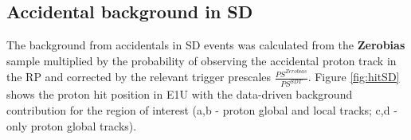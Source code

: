 \subsection{Accidental background in SD}
The background from accidentals in SD events was calculated from the \textbf{Zerobias} sample multiplied by the probability of observing the accidental proton track in the RP and corrected by the relevant trigger prescales $\frac{PS^{Zerobias}}{PS^{SDT}}$. Figure \ref{fig:hitSD} shows the proton hit position in E1U with the data-driven background contribution for the region of interest (a,b - proton global and local tracks; c,d - only proton global tracks). 
\begin{figure}[hb]
	\centering
	\parbox{0.48\textwidth}{
		\centering
		\begin{subfigure}[b]{\linewidth}{
				}
		\end{subfigure}
	}
	\quad
	\parbox{0.48\textwidth}{
		\centering
		\begin{subfigure}[b]{\linewidth}{
				}

\end{subfigure}}
\end{figure}
